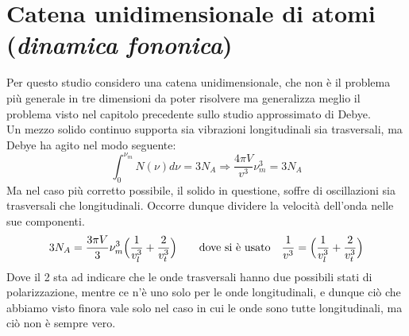 

\section{Catena unidimensionale di atomi (\textit{dinamica fononica})}
Per questo studio considero una catena unidimensionale, che non è il problema più generale in tre dimensioni da poter risolvere ma generalizza meglio il problema visto nel capitolo precedente sullo studio approssimato di Debye. \\

Un mezzo solido continuo supporta sia vibrazioni longitudinali sia trasversali, ma Debye ha agito nel modo seguente:
\begin{equation}
\int_0^{\nu_m} N(\nu) d\nu = 3 N_A \Rightarrow \frac{ 4\pi V}{v^3 } \nu_m^3 = 3 N_A
\end{equation}
Ma nel caso più corretto possibile, il solido in questione, soffre di oscillazioni sia trasversali che longitudinali.
Occorre dunque dividere la velocità dell'onda nelle sue componenti.
\begin{equation}
3N_A = \frac{ 3 \pi V}{3 } \nu_m^3 \Bigl(  \frac{ 1}{v_l^3 } + \frac{ 2}{v_t^3 }  \Bigr) \quad\quad \mbox{dove si è usato} \quad
\frac{ 1}{v^3 } = \Bigl(  \frac{ 1}{v_l^3 } + \frac{ 2}{v_t^3 }  \Bigr)
\end{equation}
Dove il 2 sta ad indicare che le onde trasversali hanno due possibili stati di polarizzazione, mentre ce n'è uno solo per le onde longitudinali,
e dunque ciò che abbiamo visto finora vale solo nel caso in cui le onde sono tutte longitudinali, ma ciò non è sempre vero. \\

